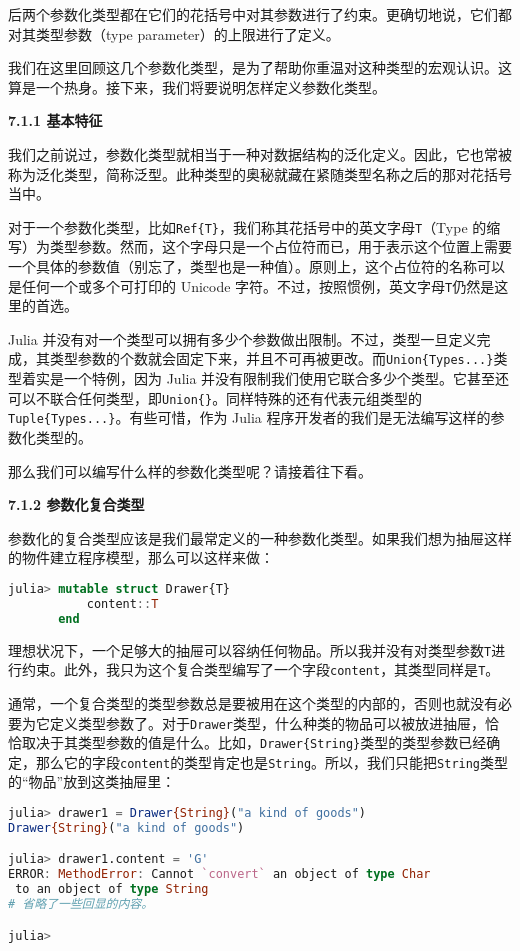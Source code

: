 后两个参数化类型都在它们的花括号中对其参数进行了约束。更确切地说，它们都对其类型参数（type parameter）的上限进行了定义。

我们在这里回顾这几个参数化类型，是为了帮助你重温对这种类型的宏观认识。这算是一个热身。接下来，我们将要说明怎样定义参数化类型。

\textbf{7.1.1 基本特征}

我们之前说过，参数化类型就相当于一种对数据结构的泛化定义。因此，它也常被称为泛化类型，简称泛型。此种类型的奥秘就藏在紧随类型名称之后的那对花括号当中。

对于一个参数化类型，比如\verb`Ref{T}`，我们称其花括号中的英文字母\verb`T`（Type 的缩写）为类型参数。然而，这个字母只是一个占位符而已，用于表示这个位置上需要一个具体的参数值（别忘了，类型也是一种值）。原则上，这个占位符的名称可以是任何一个或多个可打印的 Unicode 字符。不过，按照惯例，英文字母\verb`T`仍然是这里的首选。

Julia 并没有对一个类型可以拥有多少个参数做出限制。不过，类型一旦定义完成，其类型参数的个数就会固定下来，并且不可再被更改。而\verb`Union{Types...}`类型着实是一个特例，因为 Julia 并没有限制我们使用它联合多少个类型。它甚至还可以不联合任何类型，即\verb`Union{}`。同样特殊的还有代表元组类型的\verb`Tuple{Types...}`。有些可惜，作为 Julia 程序开发者的我们是无法编写这样的参数化类型的。

那么我们可以编写什么样的参数化类型呢？请接着往下看。

\textbf{7.1.2 参数化复合类型}

参数化的复合类型应该是我们最常定义的一种参数化类型。如果我们想为抽屉这样的物件建立程序模型，那么可以这样来做：
\begin{lstlisting}[language=julia]
julia> mutable struct Drawer{T}
           content::T
       end 
\end{lstlisting}

理想状况下，一个足够大的抽屉可以容纳任何物品。所以我并没有对类型参数\verb`T`进行约束。此外，我只为这个复合类型编写了一个字段\verb`content`，其类型同样是\verb`T`。

通常，一个复合类型的类型参数总是要被用在这个类型的内部的，否则也就没有必要为它定义类型参数了。对于\verb`Drawer`类型，什么种类的物品可以被放进抽屉，恰恰取决于其类型参数的值是什么。比如，\verb`Drawer{String}`类型的类型参数已经确定，那么它的字段\verb`content`的类型肯定也是\verb`String`。所以，我们只能把\verb`String`类型的“物品”放到这类抽屉里：
\begin{lstlisting}[language=julia]
julia> drawer1 = Drawer{String}("a kind of goods")
Drawer{String}("a kind of goods")

julia> drawer1.content = 'G'
ERROR: MethodError: Cannot `convert` an object of type Char
 to an object of type String
# 省略了一些回显的内容。

julia> 
\end{lstlisting}


